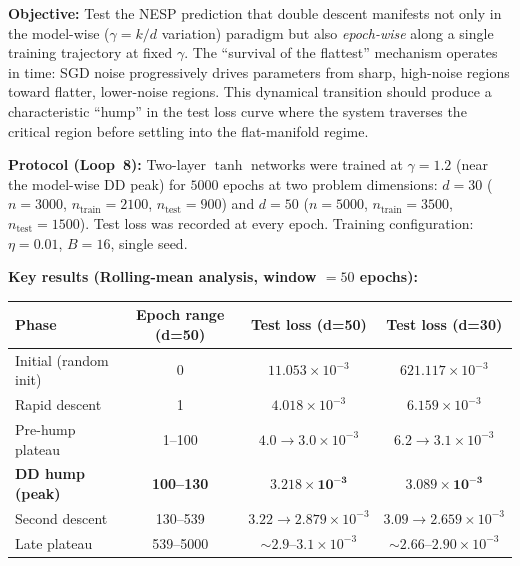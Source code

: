 \documentclass[
  journal=largetwo,
  simfonts=false,
  year=2025,
  volume=37,
]{cup-journal}
\begin{document}
\textbf{Objective:} Test the NESP prediction that double descent manifests not only in the model-wise ($\gamma = k/d$ variation) paradigm but also \emph{epoch-wise} along a single training trajectory at fixed $\gamma$. The ``survival of the flattest'' mechanism operates in time: SGD noise progressively drives parameters from sharp, high-noise regions toward flatter, lower-noise regions. This dynamical transition should produce a characteristic ``hump'' in the test loss curve where the system traverses the critical region before settling into the flat-manifold regime.

\textbf{Protocol (Loop~8):} Two-layer $\tanh$ networks were trained at $\gamma=1.2$ (near the model-wise DD peak) for $5000$ epochs at two problem dimensions: $d=30$ ($n=3000$, $n_{\mathrm{train}}=2100$, $n_{\mathrm{test}}=900$) and $d=50$ ($n=5000$, $n_{\mathrm{train}}=3500$, $n_{\mathrm{test}}=1500$). Test loss was recorded at every epoch. Training configuration: $\eta=0.01$, $B=16$, single seed.

\textbf{Key results (Rolling-mean analysis, window $=50$ epochs):}

\vspace{4pt}
\begin{center}
\begin{tabular}{ lccc }
\toprule
\textbf{Phase} & \textbf{Epoch range (d=50)} & \textbf{Test loss (d=50)} & \textbf{Test loss (d=30)} \\
\midrule
Initial (random init)  & 0     & $11.053 \times 10^{-3}$  & $621.117 \times 10^{-3}$ \\
Rapid descent          & 1     & $4.018 \times 10^{-3}$   & $6.159 \times 10^{-3}$  \\
Pre-hump plateau       & 1--100 & $4.0 \to 3.0 \times 10^{-3}$ & $6.2 \to 3.1 \times 10^{-3}$ \\
\textbf{DD hump (peak)} & \textbf{100--130} & $\mathbf{3.218 \times 10^{-3}}$ & $\mathbf{3.089 \times 10^{-3}}$ \\
Second descent         & 130--539 & $3.22 \to 2.879 \times 10^{-3}$ & $3.09 \to 2.659 \times 10^{-3}$ \\
Late plateau           & 539--5000 & $\sim 2.9$--$3.1 \times 10^{-3}$ & $\sim 2.66$--$2.90 \times 10^{-3}$ \\
\bottomrule
\end{tabular}
\end{center}
\vspace{4pt}
\end{document}
